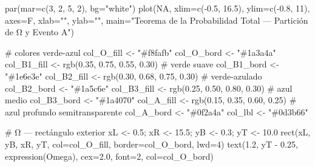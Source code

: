 \documentclass[
  letterpaper,
  DIV=11,
  numbers=noendperiod]{scrartcl}
\newenvironment{Shaded}{\begin{snugshade}}{\end{snugshade}}
\newcommand{\AttributeTok}[1]{\textcolor[rgb]{0.40,0.45,0.13}{#1}}
\newcommand{\CommentTok}[1]{\textcolor[rgb]{0.37,0.37,0.37}{#1}}
\newcommand{\ConstantTok}[1]{\textcolor[rgb]{0.56,0.35,0.01}{#1}}
\newcommand{\DecValTok}[1]{\textcolor[rgb]{0.68,0.00,0.00}{#1}}
\newcommand{\FloatTok}[1]{\textcolor[rgb]{0.68,0.00,0.00}{#1}}
\newcommand{\FunctionTok}[1]{\textcolor[rgb]{0.28,0.35,0.67}{#1}}
\newcommand{\NormalTok}[1]{\textcolor[rgb]{0.00,0.23,0.31}{#1}}
\newcommand{\OtherTok}[1]{\textcolor[rgb]{0.00,0.23,0.31}{#1}}
\newcommand{\SpecialCharTok}[1]{\textcolor[rgb]{0.37,0.37,0.37}{#1}}
\newcommand{\StringTok}[1]{\textcolor[rgb]{0.13,0.47,0.30}{#1}}
\begin{document}
\begin{Shaded}
\begin{Highlighting}[]
\FunctionTok{par}\NormalTok{(}\AttributeTok{mar=}\FunctionTok{c}\NormalTok{(}\DecValTok{3}\NormalTok{, }\DecValTok{2}\NormalTok{, }\DecValTok{5}\NormalTok{, }\DecValTok{2}\NormalTok{), }\AttributeTok{bg=}\StringTok{"white"}\NormalTok{)}
\FunctionTok{plot}\NormalTok{(}\ConstantTok{NA}\NormalTok{, }\AttributeTok{xlim=}\FunctionTok{c}\NormalTok{(}\SpecialCharTok{{-}}\FloatTok{0.5}\NormalTok{, }\FloatTok{16.5}\NormalTok{), }\AttributeTok{ylim=}\FunctionTok{c}\NormalTok{(}\SpecialCharTok{{-}}\FloatTok{0.8}\NormalTok{, }\DecValTok{11}\NormalTok{), }\AttributeTok{axes=}\NormalTok{F, }\AttributeTok{xlab=}\StringTok{""}\NormalTok{, }\AttributeTok{ylab=}\StringTok{""}\NormalTok{,}
     \AttributeTok{main=}\StringTok{"Teorema de la Probabilidad Total — Partición de Ω y Evento A"}\NormalTok{)}

\CommentTok{\# colores verde{-}azul}
\NormalTok{col\_O\_fill  }\OtherTok{\textless{}{-}} \StringTok{"\#f8fafb"}
\NormalTok{col\_O\_bord  }\OtherTok{\textless{}{-}} \StringTok{"\#1a3a4a"}
\NormalTok{col\_B1\_fill }\OtherTok{\textless{}{-}} \FunctionTok{rgb}\NormalTok{(}\FloatTok{0.35}\NormalTok{, }\FloatTok{0.75}\NormalTok{, }\FloatTok{0.55}\NormalTok{, }\FloatTok{0.30}\NormalTok{)   }\CommentTok{\# verde suave}
\NormalTok{col\_B1\_bord }\OtherTok{\textless{}{-}} \StringTok{"\#1e6e3e"}
\NormalTok{col\_B2\_fill }\OtherTok{\textless{}{-}} \FunctionTok{rgb}\NormalTok{(}\FloatTok{0.30}\NormalTok{, }\FloatTok{0.68}\NormalTok{, }\FloatTok{0.75}\NormalTok{, }\FloatTok{0.30}\NormalTok{)   }\CommentTok{\# verde{-}azulado}
\NormalTok{col\_B2\_bord }\OtherTok{\textless{}{-}} \StringTok{"\#1a5c6e"}
\NormalTok{col\_B3\_fill }\OtherTok{\textless{}{-}} \FunctionTok{rgb}\NormalTok{(}\FloatTok{0.25}\NormalTok{, }\FloatTok{0.50}\NormalTok{, }\FloatTok{0.80}\NormalTok{, }\FloatTok{0.30}\NormalTok{)   }\CommentTok{\# azul medio}
\NormalTok{col\_B3\_bord }\OtherTok{\textless{}{-}} \StringTok{"\#1a4070"}
\NormalTok{col\_A\_fill  }\OtherTok{\textless{}{-}} \FunctionTok{rgb}\NormalTok{(}\FloatTok{0.15}\NormalTok{, }\FloatTok{0.35}\NormalTok{, }\FloatTok{0.60}\NormalTok{, }\FloatTok{0.25}\NormalTok{)   }\CommentTok{\# azul profundo semitransparente}
\NormalTok{col\_A\_bord  }\OtherTok{\textless{}{-}} \StringTok{"\#0f2a4a"}
\NormalTok{col\_lbl     }\OtherTok{\textless{}{-}} \StringTok{"\#0d3b66"}

\CommentTok{\# Ω — rectángulo exterior}
\NormalTok{xL }\OtherTok{\textless{}{-}} \FloatTok{0.5}\NormalTok{; xR }\OtherTok{\textless{}{-}} \FloatTok{15.5}\NormalTok{; yB }\OtherTok{\textless{}{-}} \FloatTok{0.3}\NormalTok{; yT }\OtherTok{\textless{}{-}} \FloatTok{10.0}
\FunctionTok{rect}\NormalTok{(xL, yB, xR, yT, }\AttributeTok{col=}\NormalTok{col\_O\_fill, }\AttributeTok{border=}\NormalTok{col\_O\_bord, }\AttributeTok{lwd=}\DecValTok{4}\NormalTok{)}
\FunctionTok{text}\NormalTok{(}\FloatTok{1.2}\NormalTok{, yT }\SpecialCharTok{{-}} \FloatTok{0.25}\NormalTok{, }\FunctionTok{expression}\NormalTok{(Omega), }\AttributeTok{cex=}\FloatTok{2.0}\NormalTok{, }\AttributeTok{font=}\DecValTok{2}\NormalTok{, }\AttributeTok{col=}\NormalTok{col\_O\_bord)}


\end{Highlighting}
\end{Shaded}
\end{document}
